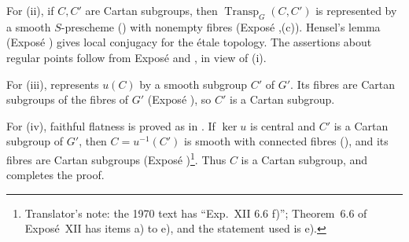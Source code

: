 For (ii), if \(C,C'\) are Cartan subgroups, then
\(\operatorname{Transp}_G(C,C')\) is represented by a smooth
\(S\)-prescheme () with nonempty fibres
(Exposé ,(c)). Hensel's lemma (Exposé ) gives local
conjugacy for the étale topology. The assertions about regular points
follow from Exposé  and , in view of (i).

For (iii),  represents \(u(C)\) by a smooth
subgroup \(C'\) of \(G'\). Its fibres are Cartan subgroups of the
fibres of \(G'\) (Exposé ), so \(C'\) is a Cartan subgroup.

For (iv), faithful flatness is proved as in .
If \(\ker u\) is central and \(C'\) is a Cartan subgroup of \(G'\),
then \(C=u^{-1}(C')\) is smooth with connected fibres
(), and its fibres are Cartan subgroups (Exposé
)\footnote{Translator's note: the 1970 text has
``Exp.\ XII 6.6 f)''; Theorem~6.6 of Exposé~XII has items a) to e), and the
statement used is e).}. Thus \(C\) is a Cartan subgroup, and  completes the proof.
